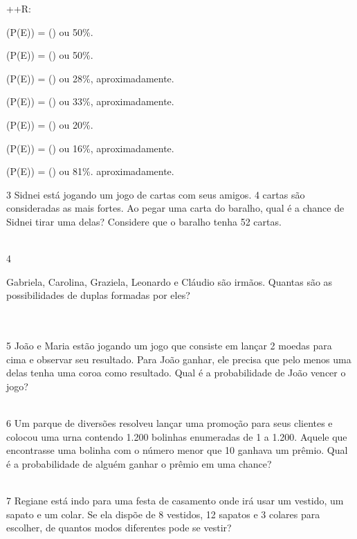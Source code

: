 ++R:
\item (P(E)) = () ou 50\%.
\item (P(E)) = () ou 50\%.
\item (P(E)) = () ou 28\%, aproximadamente.
\item (P(E)) = () ou 33\%, aproximadamente.
\item (P(E)) = () ou 20\%.
\item (P(E)) = () ou 16\%, aproximadamente.
\item (P(E)) = () ou 81\%.
aproximadamente.

\num{3} Sidnei está jogando um jogo de cartas com seus amigos. 4 cartas são
consideradas as mais fortes. Ao pegar uma carta do baralho, qual é a
chance de Sidnei tirar uma delas? Considere que o baralho tenha 52
cartas.

\\

\num{4}

Gabriela, Carolina, Graziela, Leonardo e Cláudio são irmãos. Quantas são
as possibilidades de duplas formadas por eles?

\\
\\

\num{5} João e Maria estão jogando um jogo que consiste em lançar 2 moedas
para cima e observar seu resultado. Para João ganhar, ele precisa que
pelo menos uma delas tenha uma coroa como resultado. Qual é a
probabilidade de João vencer o jogo?

\\

\num{6} Um parque de diversões resolveu lançar uma promoção para seus
clientes e colocou uma urna contendo 1.200 bolinhas enumeradas de 1 a
1.200. Aquele que encontrasse uma bolinha com o número menor que 10
ganhava um prêmio. Qual é a probabilidade de alguém ganhar o prêmio em
uma chance?

\\

\num{7} Regiane está indo para uma festa de casamento onde irá usar um
vestido, um sapato e um colar. Se ela dispõe de 8 vestidos, 12 sapatos e
3 colares para escolher, de quantos modos diferentes pode se vestir?

